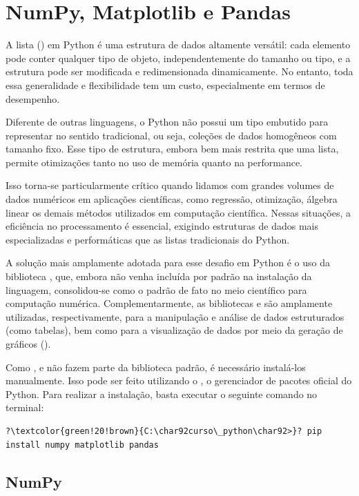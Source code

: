 \chapter{NumPy, Matplotlib e Pandas}\label{numpy}

A lista () em Python é uma estrutura de dados altamente versátil: cada elemento pode conter qualquer tipo
de objeto, independentemente do tamanho ou tipo, e a estrutura pode ser modificada e redimensionada dinamicamente.
No entanto, toda essa generalidade e flexibilidade tem um custo, especialmente em termos de desempenho.

Diferente de outras linguagens, o Python não possui um tipo embutido para representar  no sentido
tradicional, ou seja, coleções de dados homogêneos com tamanho fixo.
Esse tipo de estrutura, embora bem mais restrita que uma lista, permite otimizações tanto no uso de memória quanto
na performance.

Isso torna-se particularmente crítico quando lidamos com grandes volumes de dados numéricos em aplicações
científicas, como regressão, otimização, álgebra linear os demais métodos utilizados em
computação científica.
Nessas situações, a eficiência no processamento é essencial, exigindo estruturas de dados mais especializadas e
performáticas que as listas tradicionais do Python.

A solução mais amplamente adotada para esse desafio em Python é o uso da biblioteca , que, embora não
venha incluída por padrão na instalação da linguagem, consolidou-se como o padrão de fato no meio científico para
computação numérica.
Complementarmente, as bibliotecas  e  são amplamente utilizadas, respectivamente,
para a manipulação e análise de dados estruturados (como tabelas), bem como para a visualização de dados por meio da
geração de gráficos ().

Como ,  e  não fazem parte da biblioteca padrão, é necessário
instalá-los manualmente.
Isso pode ser feito utilizando o , o gerenciador de pacotes oficial do Python.
Para realizar a instalação, basta executar o seguinte comando no terminal:
\begin{verbatim}
?\textcolor{green!20!brown}{C:\char92curso\_python\char92>}? pip install numpy matplotlib pandas
\end{verbatim}


\section{NumPy}

